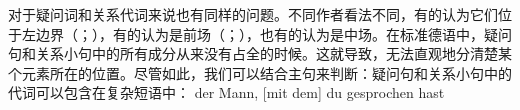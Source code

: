 对于疑问词和关系代词来说也有同样的问题。不同作者看法不同，有的认为它们位于左边界（\citealp{Kathol2001a}；\citealp[]{Eisenberg2004a}），有的认为是前场（\citealp[§1345]{Duden2005-Authors}；\citealp[--30, \S~3.1]{Woellstein2010a-u}），也有的认为是中场\citep[]{AH2004a-u}。在标准德语中，疑问句和关系小句中的所有成分从来没有占全的时候。这就导致，无法直观地分清楚某个元素所在的位置。尽管如此，我们可以结合主句来判断：疑问句和关系小句中的代词可以包含在复杂短语中：
\eal
\ex 
\gll der Mann,         [mit dem] du gesprochen hast\\
